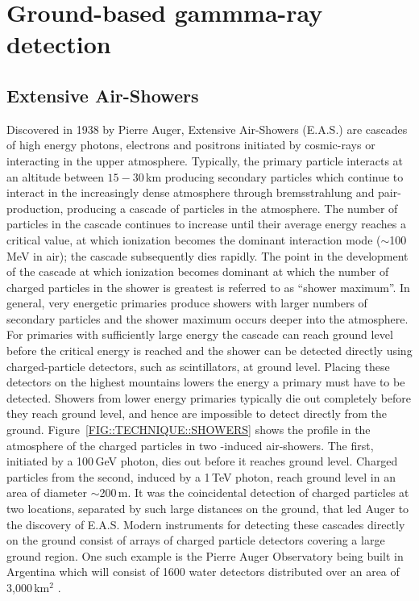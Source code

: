 \chapter{Ground-based gammma-ray detection}
\label{CHAP::TECHNIQUE}

\section{Extensive Air-Showers}
\label{SEC::TECHNIQUE::SHOWERS}

Discovered in 1938 by Pierre Auger, Extensive Air-Showers (E.A.S.) are
cascades of high energy photons, electrons and positrons initiated by
cosmic-rays or \Grays interacting in the upper atmosphere. Typically,
the primary particle interacts at an altitude between $15-30$\,km
producing secondary particles which continue to interact in the
increasingly dense atmosphere through bremsstrahlung and
pair-production, producing a cascade of particles in the
atmosphere. The number of particles in the cascade continues to
increase until their average energy reaches a critical value, at which
ionization becomes the dominant interaction mode ($\sim$100\,MeV in
air); the cascade subsequently dies rapidly. The point in the
development of the cascade at which ionization becomes dominant at
which the number of charged particles in the shower is greatest is
referred to as ``shower maximum''. In general, very energetic
primaries produce showers with larger numbers of secondary particles
and the shower maximum occurs deeper into the atmosphere. For
primaries with sufficiently large energy the cascade can reach ground
level before the critical energy is reached and the shower can be
detected directly using charged-particle detectors, such as
scintillators, at ground level. Placing these detectors on the highest
mountains lowers the energy a primary must have to be
detected. Showers from lower energy primaries typically die out
completely before they reach ground level, and hence are impossible to
detect directly from the ground.  Figure~\ref{FIG::TECHNIQUE::SHOWERS}
shows the profile in the atmosphere of the charged particles in two
{\Grayc}-induced air-showers. The first, initiated by a 100\,GeV
photon, dies out before it reaches ground level. Charged particles
from the second, induced by a 1\,TeV photon, reach ground level in an
area of diameter $\sim$200\,m. It was the coincidental detection of
charged particles at two locations, separated by such large distances
on the ground, that led Auger to the discovery of E.A.S. Modern
instruments for detecting these cascades directly on the ground
consist of arrays of charged particle detectors covering a large
ground region. One such example is the Pierre Auger Observatory being
built in Argentina which will consist of 1600 water \Cerenkov
detectors distributed over an area of 3,000\,km$^2$
\citep{REF::AUGER::1996PROPOSAL}.

